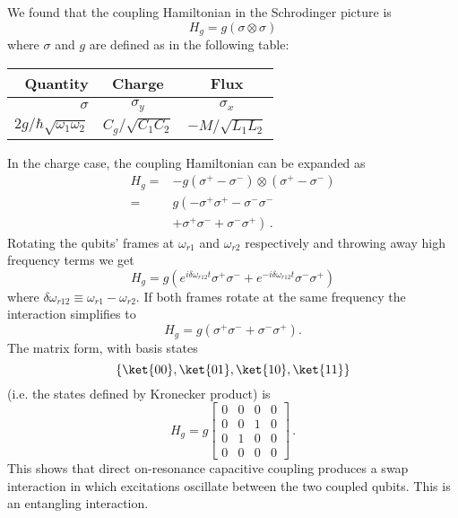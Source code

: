 We found that the coupling Hamiltonian in the Schrodinger picture is
\begin{equation}
  H_g = g \left( \sigma \otimes \sigma \right)
\end{equation}
where $\sigma$ and $g$ are defined as in the following table:
\begin{center}
  \begin{tabular}{r|cc}
    \hline
    \textbf{Quantity} & \textbf{Charge} & \textbf{Flux} \\
    \hline
    $\sigma$ & $\sigma_y$ & $\sigma_x$ \\

    $2g / \hbar \sqrt{\omega_1 \omega_2}$ & $C_g / \sqrt{C_1 C_2}$ & $-M/\sqrt{L_1L_2}$ \\
    \hline
  \end{tabular}
\end{center}
In the charge case, the coupling Hamiltonian can be expanded as
\begin{align*}
  H_g
    =& -g (\sigma^+ - \sigma^-) \otimes (\sigma^+ - \sigma^-) \\
    =& g \left(-\sigma^+ \sigma^+ - \sigma^- \sigma^- \right. \\
     & \left. + \sigma^+ \sigma^- + \sigma^- \sigma^+ \right) \, .
\end{align*}
Rotating the qubits' frames at $\omega_{r1}$ and $\omega_{r2}$ respectively and throwing away high frequency terms we get
\begin{equation}
  H_g = g
  \left(
      e^{ i \delta\omega_{r12} t} \sigma^+ \sigma^-
    + e^{-i \delta\omega_{r12} t} \sigma^- \sigma^+
  \right)
\end{equation}
where $\delta\omega_{r12}\equiv \omega_{r1} - \omega_{r2}$.
If both frames rotate at the same frequency the interaction simplifies to
\begin{equation}
  H_g = g \left( \sigma^+ \sigma^- + \sigma^- \sigma^+ \right).
\end{equation}
The matrix form, with basis states
\begin{equation*}
  \left\{ \ket{00}, \ket{01}, \ket{10}, \ket{11} \right\}
\end{equation*}
(i.e. the states defined by Kronecker product) is
\begin{equation}
  H_g =
  g \left[ \begin{array}{cccc}
    0 & 0 & 0 & 0 \\
    0 & 0 & 1 & 0 \\
    0 & 1 & 0 & 0 \\
    0 & 0 & 0 & 0
  \end{array} \right] \, .
\end{equation}
This shows that direct on-resonance capacitive coupling produces a swap interaction in which excitations oscillate between the two coupled qubits.
This is an entangling interaction.
